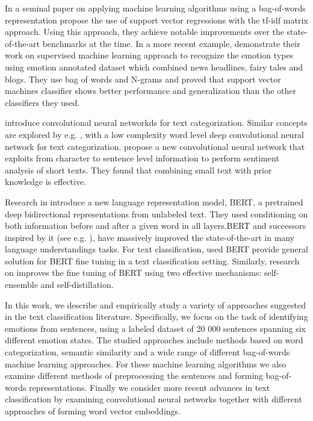 \documentclass[conference]{IEEEtran}
\begin{document}
In a seminal paper on applying machine learning algorithms using a bag-of-words representation \cite{joachims-svm} propose the use of support vector regressions with the tf-idf matrix approach. Using this approach, they achieve notable improvements over the state-of-the-art benchmarks at the time. In a more recent example, \cite{chaffaretal}  demonstrate their work on supervised machine learning approach to recognize the emotion types using emotion annotated dataset which combined news headlines, fairy tales and blogs. They use bag of words and N-grams and proved that support vector machines classifier shows better performance and generalization than the other classifiers they used. 

\cite{kim-2014-convolutional} introduce convolutional neural networkds for text categorization. Similar concepts are explored by e.g. \cite{johnsonetal}, with a low complexity word level deep convolutional neural network for text categorization. \cite{dossantosetal} propose a new convolutional neural network that exploits from character to sentence level information to perform sentiment analysis of short texts. They found that combining small text with prior knowledge is effective.

Research in \cite{bert} introduce a new language representation model, BERT, a pretrained deep bidirectional representations from unlabeled text. They used conditioning on both information before and after a given word in all layers.BERT and successors inspired by it (see e.g. \cite{xlnet}), have massively improved the state-of-the-art in many language understandings tasks. For text classification, \cite{ bertclassification} used BERT provide general solution for BERT fine tuning in a text classification setting. Similarly, research on \cite{xu2020improving} improves the fine tuning of BERT using two effective mechanisms: self-ensemble and self-distillation.

In this work, we describe and empirically study a variety of approaches suggested in the text classification literature. Specifically, we focus on the task of identifying emotions from sentences, using a labeled dataset of 20 000 sentences spanning six different emotion states. The studied approaches include methods based on word categorization, semantic similarity and a wide range of different bag-of-words machine learning approaches. For these machine learning algorithms we also examine different methods of  preprocessing the sentences and forming bag-of-words representations. Finally we consider more recent advances in text classification by examining convolutional neural networks together with different approaches of forming word vector embeddings. 
\end{document}

